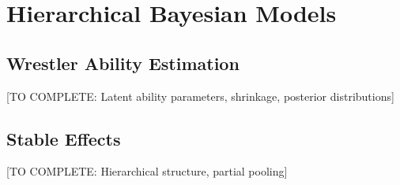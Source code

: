 \section{Hierarchical Bayesian Models}

\subsection{Wrestler Ability Estimation}

[TO COMPLETE: Latent ability parameters, shrinkage, posterior distributions]

\subsection{Stable Effects}

[TO COMPLETE: Hierarchical structure, partial pooling]